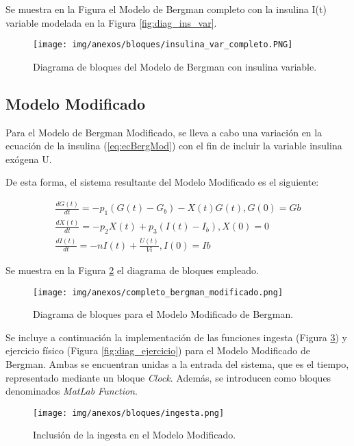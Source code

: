Se muestra en la Figura el Modelo de Bergman completo con la insulina I(t) variable modelada en la Figura \ref{fig:diag_ins_var}.
\clearpage

\begin{figure}[htbp]
    \centering
    \texttt{[image: img/anexos/bloques/insulina\_var\_completo.PNG]}
    \caption{Diagrama de bloques del Modelo de Bergman con insulina variable.}
    \label{fig:diag_ins_var_completo}
\end{figure}
\clearpage
\subsection{Modelo Modificado}

Para el Modelo de Bergman Modificado, se lleva a cabo una variación en la ecuación de la insulina (\ref{eq:ecBergMod}) con el fin de incluir la variable insulina exógena U. 

De esta forma, el sistema resultante del Modelo Modificado es el siguiente:

\begin{align}
    \frac{dG(t)}{dt}= -p_1 (G(t) - G_b) - X(t)G(t), G(0)=Gb \\ \label{eq:glucosa_mod_mod}
    \frac{dX(t)}{dt}= -p_2 X(t) + p_3(I(t) - I_b), X(0) = 0 \\
    \frac{dI(t)}{dt}= -n I(t) + \frac{U(t)}{Vi}, I(0) = Ib 
    \label{eq:ecBergMod}
\end{align}

Se muestra en la Figura \ref{fig:diag_mod_bergman} el diagrama de bloques empleado.

\begin{figure}[htbp]
    \centering
    \texttt{[image: img/anexos/completo\_bergman\_modificado.png]}
    \caption{Diagrama de bloques para el Modelo Modificado de Bergman.}
    \label{fig:diag_mod_bergman}
\end{figure}
\clearpage
Se incluye a continuación la implementación de las funciones ingesta (Figura \ref{fig:diag_ingesta}) y ejercicio físico (Figura \ref{fig:diag_ejercicio}) para el Modelo Modificado de Bergman. Ambas se encuentran unidas a la entrada del sistema, que es el tiempo, representado mediante un bloque \textit{Clock}. Además, se introducen como bloques denominados \textit{MatLab Function}.

\begin{figure}[htbp]
    \centering
    \texttt{[image: img/anexos/bloques/ingesta.png]}
    \caption{Inclusión de la ingesta en el Modelo Modificado.}
    \label{fig:diag_ingesta}
\end{figure}

